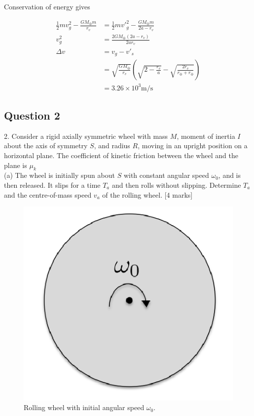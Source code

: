 \documentclass{article}
\begin{document}
Conservation of energy gives

\begin{align}
\frac{1}{2} m v_g^2 - \frac{GM_\oplus m}{r_v} &= \frac{1}{2}m{v'}_g^2- \frac{GM_\oplus m}{2a-r_v} \\
v_g^2 &= \frac{2GM_\oplus (2a - r_v) }{2ar_v} \\
\Delta v &= v_g - v'_s \\
&= \sqrt{\frac{GM_\oplus}{r_v}}\left( \sqrt{2-\frac{r_v}{a}} - \sqrt{\frac{2r_v}{r_\oplus + r_\oplus}}\right) \\
&= 3.26 \times 10^3 \mathrm{m/s}
\end{align}

\pagebreak
\subsection{Question 2}
2. Consider a rigid axially symmetric wheel with mass $M$, moment of inertia $I$ about the axis of symmetry $S$, and radius $R$, moving in an upright position on a horizontal plane. The coefficient of kinetic friction between the wheel and the plane is $\mu_{k}$ \\
(a) The wheel is initially spun about $S$ with constant angular speed $\omega_{0}$, and is then released. It slips for a time $T_{a}$ and then rolls without slipping. Determine $T_{a}$ and the centre-of-mass speed $v_{a}$ of the rolling wheel. [4 marks] \\ 

\begin{figure}
	\centering
	\includegraphics[width=0.5\linewidth]{spho_book_TYS_images/2016q2.png}
	\caption{Rolling wheel with initial angular speed $\omega_0$.}
\end{figure}
\end{document}
